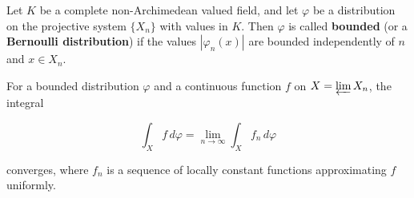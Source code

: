 Let $K$ be a complete non-Archimedean valued field, and let $\varphi$ be a distribution
on the projective system $\{X_n\}$ with values in $K$. Then $\varphi$ is called
\textbf{bounded} (or a \textbf{Bernoulli distribution}) if the values
$|\varphi_n(x)|$ are bounded independently of $n$ and $x \in X_n$.

For a bounded distribution $\varphi$ and a continuous function $f$ on
$X = \varprojlim X_n$, the integral

$$\int_X f \, d\varphi = \lim_{n \to \infty} \int_X f_n \, d\varphi$$

converges, where $f_n$ is a sequence of locally constant functions approximating $f$
uniformly.

